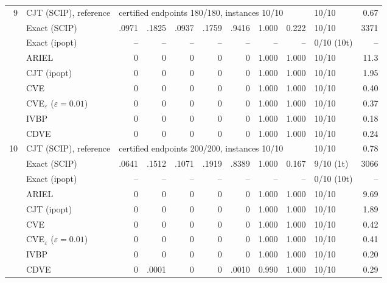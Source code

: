 \begin{table}[htbp]
\begin{tabular}{rlrrrrrrrlr}
\midrule
9 & CJT (SCIP), reference & \multicolumn{7}{l}{certified endpoints 180/180, instances 10/10} & 10/10 & 0.67 \\
 & Exact (SCIP) & .0971 & .1825 & .0937 & .1759 & .9416 & 1.000 & 0.222 & 10/10 & 3371 \\
 & Exact (ipopt) & -- & -- & -- & -- & -- & -- & -- & 0/10 (10t) & -- \\
 & ARIEL & 0 & 0 & 0 & 0 & 0 & 1.000 & 1.000 & 10/10 & 11.3 \\
 & CJT (ipopt) & 0 & 0 & 0 & 0 & 0 & 1.000 & 1.000 & 10/10 & 1.95 \\
 & CVE & 0 & 0 & 0 & 0 & 0 & 1.000 & 1.000 & 10/10 & 0.40 \\
 & CVE$_\varepsilon$ ($\varepsilon{=}0.01$) & 0 & 0 & 0 & 0 & 0 & 1.000 & 1.000 & 10/10 & 0.37 \\
 & IVBP & 0 & 0 & 0 & 0 & 0 & 1.000 & 1.000 & 10/10 & 0.18 \\
 & CDVE & 0 & 0 & 0 & 0 & 0 & 1.000 & 1.000 & 10/10 & 0.24 \\
\midrule
10 & CJT (SCIP), reference & \multicolumn{7}{l}{certified endpoints 200/200, instances 10/10} & 10/10 & 0.78 \\
 & Exact (SCIP) & .0641 & .1512 & .1071 & .1919 & .8389 & 1.000 & 0.167 & 9/10 (1t) & 3066 \\
 & Exact (ipopt) & -- & -- & -- & -- & -- & -- & -- & 0/10 (10t) & -- \\
 & ARIEL & 0 & 0 & 0 & 0 & 0 & 1.000 & 1.000 & 10/10 & 9.69 \\
 & CJT (ipopt) & 0 & 0 & 0 & 0 & 0 & 1.000 & 1.000 & 10/10 & 1.89 \\
 & CVE & 0 & 0 & 0 & 0 & 0 & 1.000 & 1.000 & 10/10 & 0.42 \\
 & CVE$_\varepsilon$ ($\varepsilon{=}0.01$) & 0 & 0 & 0 & 0 & 0 & 1.000 & 1.000 & 10/10 & 0.41 \\
 & IVBP & 0 & 0 & 0 & 0 & 0 & 1.000 & 1.000 & 10/10 & 0.20 \\
 & CDVE & 0 & .0001 & 0 & 0 & .0010 & 0.990 & 1.000 & 10/10 & 0.29 \\
\bottomrule
\end{tabular}
\end{table}
